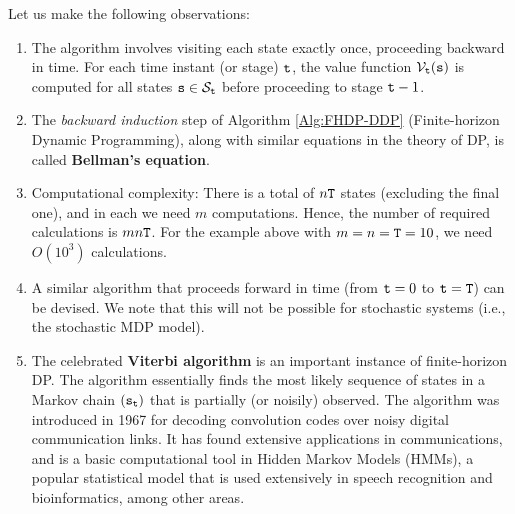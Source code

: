 Let us make
the following observations:
\begin{enumerate}
  \item
The algorithm involves visiting each state exactly once, proceeding
backward in time. For each time instant (or stage) ${\tt t}$, the
value function ${\mathcal{V}_{{\tt t}}}({\tt s})$ is computed for all
states ${\tt s} \in {\mathcal{S}_{{\tt t}}}$ before proceeding to stage
${\tt t} - 1$.
  \item
The {\em backward induction} step of Algorithm \ref{Alg:FHDP-DDP} (Finite-horizon Dynamic Programming),
along with similar equations in the theory of DP, is called
\textbf{Bellman's equation}.
  \item
Computational complexity: There is a total of $n{\tt T}$ states
(excluding the final one), and in each we need $m$ computations.
Hence, the number of required calculations is $mn{\tt T}$. For the
example above with $m = n = {\tt T} = 10$, we need $O({10^3})$
calculations.
  \item
A similar algorithm that proceeds forward in time (from ${\tt t} = 0$
to ${\tt t} = {\tt T}$) can be devised. We note that this will not
be possible for stochastic systems (i.e., the stochastic MDP model).
  \item
The celebrated \textbf{Viterbi algorithm} is an important instance
of finite-horizon DP. The algorithm essentially finds the most
likely sequence of states in a Markov chain $({{\tt s}_{{\tt t}}})$
that is partially (or noisily) observed. The algorithm was
introduced in 1967 for decoding convolution codes over noisy digital
communication links. It has found extensive applications in
communications, and is a basic computational tool in Hidden Markov
Models (HMMs), a popular statistical model that is used extensively
in speech recognition and bioinformatics, among other areas.
\end{enumerate}



